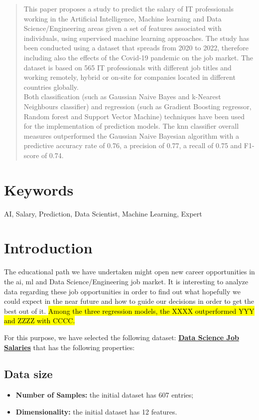 \documentclass[11pt,a4paper]{article}
\newcommand{\hint}[1]{%
  \begingroup
  \sethlcolor{yellow!30}%
  \hl{#1}%
  \endgroup
}
\def\keywords{\section*{Keywords}}
\begin{document}
\maketitle
\begin{abstract}
This paper proposes a study to predict the salary of IT professionals working in the Artificial Intelligence, Machine learning and Data Science/Engineering areas given a set of features associated with individuals, using supervised machine learning approaches. The study has been conducted using a dataset that spreads from 2020 to 2022, therefore including also the effects of the Covid-19 pandemic on the job market. The dataset is based on 565 IT professionals with different job titles and working remotely, hybrid or on-site for companies located in different countries globally. \\
Both classification (such as Gaussian Naive Bayes and k-Nearest Neighbours classifier) and regression (such as Gradient Boosting regressor, Random forest and Support Vector Machine) techniques have been used for the implementation of prediction models. The \acrshort{knn} classifier overall measures outperformed the Gaussian Naive Bayesian algorithm with a predictive accuracy rate of 0.76, a precision of 0.77, a recall of 0.75 and F1-score of 0.74.

\end{abstract}

\keywords{AI, Salary, Prediction, Data Scientist, Machine Learning, Expert}

\section{Introduction}
The educational path we have undertaken might open new career opportunities in the \acrfull{ai}, \acrfull{ml} and Data Science/Engineering job market. It is interesting to analyze data regarding these job opportunities in order to find out what hopefully we could expect in the near future and how to guide our decisions in order to get the best out of it.
\hint{Among the three regression models, the XXXX outperformed YYY and ZZZZ with CCCC.}

For this purpose, we have selected the following dataset: \href{https://www.kaggle.com/datasets/ruchi798/data-science-job-salaries}{\textbf{Data Science Job Salaries}} that has the following properties:


\subsection{Data size} 
\begin{itemize}
\item \textbf{Number of Samples:} the initial dataset has 607 entries;
\item \textbf{Dimensionality:} the initial dataset has 12 features.
\end{itemize}
\end{document}
